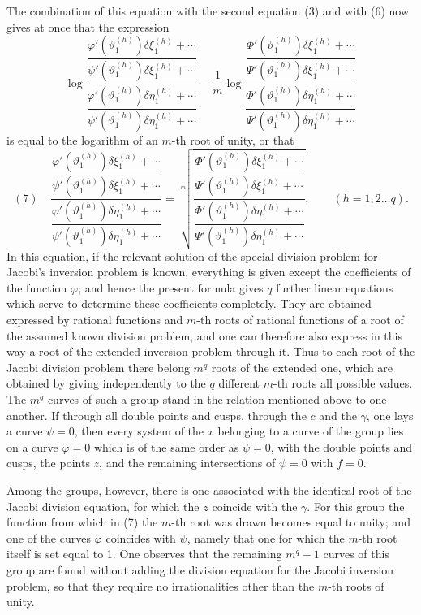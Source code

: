 \documentclass[10pt]{article}
\begin{document}
The combination of this equation with the second equation (3) and with (6) now gives at once that the expression
\[
\log\frac{\dfrac{\varphi'(\vartheta_1^{(h)})\delta\xi_1^{(h)}+\cdots}
{\psi'(\vartheta_1^{(h)})\delta\xi_1^{(h)}+\cdots}}
{\dfrac{\varphi'(\vartheta_1^{(h)})\delta\eta_1^{(h)}+\cdots}
{\psi'(\vartheta_1^{(h)})\delta\eta_1^{(h)}+\cdots}}
-\frac1m
\log\frac{\dfrac{\Phi'(\vartheta_1^{(h)})\delta\xi_1^{(h)}+\cdots}
{\Psi'(\vartheta_1^{(h)})\delta\xi_1^{(h)}+\cdots}}
{\dfrac{\Phi'(\vartheta_1^{(h)})\delta\eta_1^{(h)}+\cdots}
{\Psi'(\vartheta_1^{(h)})\delta\eta_1^{(h)}+\cdots}}
\]
is equal to the logarithm of an \(m\)-th root of unity, or that
\[
(7)\quad
\frac{\dfrac{\varphi'(\vartheta_1^{(h)})\delta\xi_1^{(h)}+\cdots}
{\psi'(\vartheta_1^{(h)})\delta\xi_1^{(h)}+\cdots}}
{\dfrac{\varphi'(\vartheta_1^{(h)})\delta\eta_1^{(h)}+\cdots}
{\psi'(\vartheta_1^{(h)})\delta\eta_1^{(h)}+\cdots}}
=
\sqrt[m]{
\frac{\dfrac{\Phi'(\vartheta_1^{(h)})\delta\xi_1^{(h)}+\cdots}
{\Psi'(\vartheta_1^{(h)})\delta\xi_1^{(h)}+\cdots}}
{\dfrac{\Phi'(\vartheta_1^{(h)})\delta\eta_1^{(h)}+\cdots}
{\Psi'(\vartheta_1^{(h)})\delta\eta_1^{(h)}+\cdots}}
},
\qquad (h=1,2\ldots q).
\]
In this equation, if the relevant solution of the special division problem for Jacobi's inversion problem is known, everything is given except the coefficients of the function \(\varphi\); and hence the present formula gives \(q\) further linear equations which serve to determine these coefficients completely. They are obtained expressed by rational functions and \(m\)-th roots of rational functions of a root of the assumed known division problem, and one can therefore also express in this way a root of the extended inversion problem through it. Thus to each root of the Jacobi division problem there belong \(m^q\) roots of the extended one, which are obtained by giving independently to the \(q\) different \(m\)-th roots all possible values. The \(m^q\) curves of such a group stand in the relation mentioned above to one another. If through all double points and cusps, through the \(c\) and the \(\gamma\), one lays a curve \(\psi=0\), then every system of the \(x\) belonging to a curve of the group lies on a curve \(\varphi=0\) which is of the same order as \(\psi=0\), with the double points and cusps, the points \(z\), and the remaining intersections of \(\psi=0\) with \(f=0\).

Among the groups, however, there is one associated with the identical root of the Jacobi division equation, for which the \(z\) coincide with the \(\gamma\). For this group the function from which in (7) the \(m\)-th root was drawn becomes equal to unity; and one of the curves \(\varphi\) coincides with \(\psi\), namely that one for which the \(m\)-th root itself is set equal to 1. One observes that the remaining \(m^q-1\) curves of this group are found without adding the division equation for the Jacobi inversion problem, so that they require no irrationalities other than the \(m\)-th roots of unity.
\end{document}
